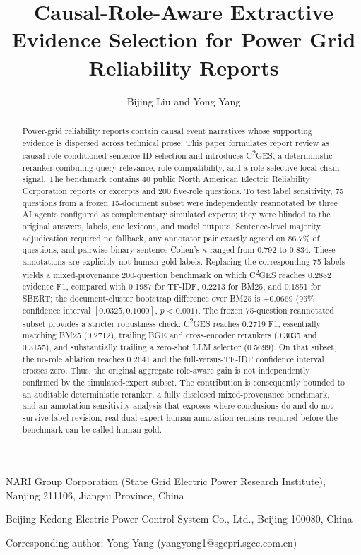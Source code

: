 \documentclass{article}
\title{Causal-Role-Aware Extractive Evidence Selection for Power Grid Reliability Reports}
\author{Bijing Liu and Yong Yang}
\date{}
\begin{document}
\maketitle

\begin{center}
NARI Group Corporation (State Grid Electric Power Research Institute), Nanjing 211106, Jiangsu Province, China

Beijing Kedong Electric Power Control System Co., Ltd., Beijing 100080, China

Corresponding author: Yong Yang (yangyong1@sgepri.sgcc.com.cn)
\end{center}

\begin{abstract}
Power-grid reliability reports contain causal event narratives whose supporting evidence is dispersed across technical prose. This paper formulates report review as causal-role-conditioned sentence-ID selection and introduces C\textsuperscript{2}GES, a deterministic reranker combining query relevance, role compatibility, and a role-selective local chain signal. The benchmark contains 40 public North American Electric Reliability Corporation reports or excerpts and 200 five-role questions. To test label sensitivity, 75 questions from a frozen 15-document subset were independently reannotated by three AI agents configured as complementary simulated experts; they were blinded to the original answers, labels, cue lexicons, and model outputs. Sentence-level majority adjudication required no fallback, any annotator pair exactly agreed on 86.7\% of questions, and pairwise binary sentence Cohen's $\kappa$ ranged from 0.792 to 0.834. These annotations are explicitly not human-gold labels. Replacing the corresponding 75 labels yields a mixed-provenance 200-question benchmark on which C\textsuperscript{2}GES reaches 0.2882 evidence F1, compared with 0.1987 for TF-IDF, 0.2213 for BM25, and 0.1851 for SBERT; the document-cluster bootstrap difference over BM25 is $+0.0669$ (95\% confidence interval $[0.0325,0.1000]$, $p<0.001$). The frozen 75-question reannotated subset provides a stricter robustness check: C\textsuperscript{2}GES reaches 0.2719 F1, essentially matching BM25 (0.2712), trailing BGE and cross-encoder rerankers (0.3035 and 0.3155), and substantially trailing a zero-shot LLM selector (0.5699). On that subset, the no-role ablation reaches 0.2641 and the full-versus-TF-IDF confidence interval crosses zero. Thus, the original aggregate role-aware gain is not independently confirmed by the simulated-expert subset. The contribution is consequently bounded to an auditable deterministic reranker, a fully disclosed mixed-provenance benchmark, and an annotation-sensitivity analysis that exposes where conclusions do and do not survive label revision; real dual-expert human annotation remains required before the benchmark can be called human-gold.
\end{abstract}
\end{document}
